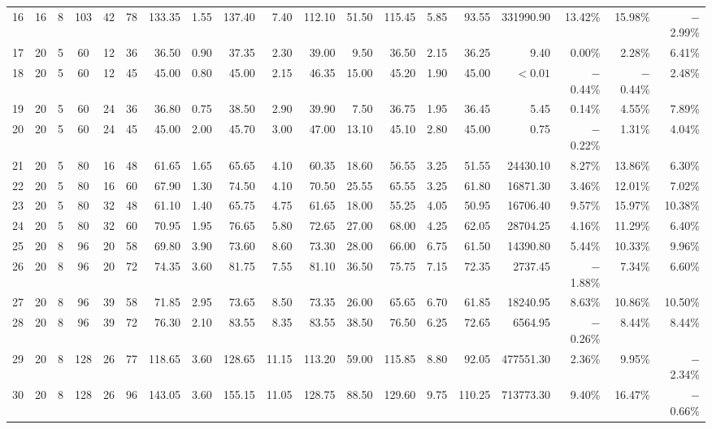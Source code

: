 \documentclass[review,3p,times,12pt,number]{elsarticle}\usepackage{amsmath}\usepackage{amssymb}
\begin{document}
\begin{landscape}
\begin{table}[htbp]
\begin{tabular}{ccccccrrrrrrrrrrrrr}
16& 16 & 8 & 103 & 42 & 78 & 133.35 & 1.55 & 137.40 & 7.40  & 112.10& 51.50 &115.45 & 5.85   & 93.55 & 331990.90 &13.42\% & 15.98\% & $-$2.99\%\\
17& 20 & 5 & 60  & 12 & 36 & 36.50  & 0.90 & 37.35  & 2.30  & 39.00 & 9.50  &36.50  & 2.15   & 36.25 & 9.40      &0.00\%       & 2.28\%  & 6.41\%\\
18& 20 & 5 & 60  & 12 & 45 & 45.00  & 0.80 & 45.00  & 2.15  & 46.35 & 15.00 &45.20  & 1.90   & 45.00 & $<0.01$   &$-$0.44\% & $-$0.44\% & 2.48\%\\
19& 20 & 5 & 60  & 24 & 36 & 36.80  & 0.75 & 38.50  & 2.90  & 39.90 & 7.50  &36.75  & 1.95   & 36.45 & 5.45      &0.14\%  & 4.55\%  & 7.89\%\\
20& 20 & 5 & 60  & 24 & 45 & 45.00  & 2.00 & 45.70  & 3.00  & 47.00 & 13.10  &45.10  & 2.80   & 45.00 & 0.75      &$-$0.22\% & 1.31\%  & 4.04\%\\
21& 20 & 5 & 80  & 16 & 48 & 61.65  & 1.65 & 65.65  & 4.10  & 60.35 & 18.60  &56.55  & 3.25   & 51.55 & 24430.10  &8.27\%  & 13.86\% & 6.30\%\\
22& 20 & 5 & 80  & 16 & 60 & 67.90  & 1.30 & 74.50  & 4.10  & 70.50 & 25.55 &65.55  & 3.25   & 61.80 & 16871.30  & 3.46\% & 12.01\% & 7.02\%\\
23& 20 & 5 & 80  & 32 & 48 & 61.10  & 1.40 & 65.75  & 4.75  & 61.65 & 18.00 &55.25  & 4.05   & 50.95 & 16706.40  & 9.57\% & 15.97\% & 10.38\%\\
24& 20 & 5 & 80  & 32 & 60 & 70.95  & 1.95 & 76.65  & 5.80  & 72.65 & 27.00 &68.00  & 4.25   & 62.05 & 28704.25  & 4.16\% & 11.29\% & 6.40\%\\
25& 20 & 8 & 96  & 20 & 58 & 69.80  & 3.90 & 73.60  & 8.60  & 73.30 & 28.00 &66.00  & 6.75   & 61.50 & 14390.80  & 5.44\% & 10.33\% & 9.96\%\\
26& 20 & 8 & 96  & 20 & 72 & 74.35  & 3.60 & 81.75  & 7.55  & 81.10 & 36.50 &75.75  & 7.15   & 72.35 & 2737.45   & $-$1.88\%& 7.34\%  & 6.60\%\\
27& 20 & 8 & 96  & 39 & 58 & 71.85  & 2.95 & 73.65  & 8.50  & 73.35 & 26.00 &65.65  & 6.70   & 61.85 & 18240.95  &8.63\%  & 10.86\% & 10.50\%\\
28& 20 & 8 & 96  & 39 & 72 & 76.30  & 2.10 & 83.55  & 8.35  & 83.55 & 38.50 &76.50  & 6.25   & 72.65 & 6564.95   &$-$0.26\% & 8.44\%  & 8.44\%\\
29& 20 & 8 & 128 & 26 & 77 & 118.65 & 3.60 & 128.65 & 11.15 & 113.20 & 59.00 &115.85 & 8.80   & 92.05 & 477551.30 &2.36\%  & 9.95\%  & $-$2.34\%\\
30& 20 & 8 & 128 & 26 & 96 & 143.05 & 3.60 & 155.15 & 11.05 & 128.75& 88.50 &129.60 & 9.75   & 110.25& 713773.30 &9.40\%   & 16.47\% & $-$0.66\%\\

\end{tabular}
\end{table}
\end{landscape}
\end{document}
